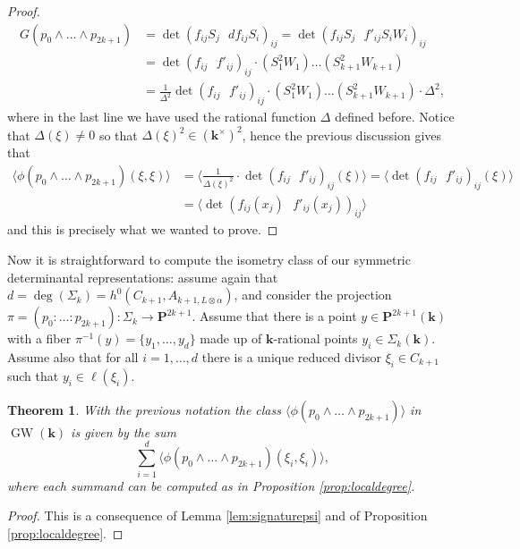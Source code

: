 \documentclass[12pt]{amsart}
\newcounter{thmcounter}
\numberwithin{equation}{section}
\numberwithin{thmcounter}{section}
\newtheorem{theorem}[thmcounter]{Theorem}
\theoremstyle{definition}
\theoremstyle{claim}
\newcommand{\kk}{\mathbf{k}}
\newcommand{\nP}{\mathbf{P}}
\DeclareMathOperator{\GW}{GW}
\begin{document}
\begin{proof}
	\begin{align*}
	 G(p_0\wedge\dots \wedge p_{2k+1}) &= \det \left( f_{ij}S_j \,\,\,\, df_{ij} S_i \right)_{ij} = \det \left( f_{ij}S_j \,\,\,\, f'_{ij} S_iW_i \right)_{ij} \\
	 &= \det\left( f_{ij} \,\,\,\, f'_{ij}  \right)_{ij}\cdot (S_1^2W_1)\dots (S^2_{k+1}W_{k+1}) \\
	 & = \frac{1}{\Delta^2}\det\left( f_{ij} \,\,\,\, f'_{ij}  \right)_{ij}\cdot (S_1^2W_1)\dots (S^2_{k+1}W_{k+1})\cdot \Delta^2,
	\end{align*}
	where in the last line we have used the rational function $\Delta$ defined before. Notice that $\Delta(\xi)\ne 0$ so that $\Delta(\xi)^2 \in (\kk^{\times})^2$, hence the previous discussion gives that
	\begin{align*}
	\langle \phi(p_0\wedge\dots\wedge p_{2k+1})(\xi,\xi) \rangle  &= \langle \frac{1}{\Delta(\xi)^2}\cdot \det \left( f_{ij} \,\,\,\, f'_{ij}  \right)_{ij}(\xi)\rangle = \langle \det \left( f_{ij} \,\,\,\, f'_{ij}  \right)_{ij}(\xi)\rangle\\
	&  = \langle \det \left( f_{ij}(x_j) \,\,\,\, f'_{ij}(x_j)  \right)_{ij}\rangle
	\end{align*}
	and this is precisely what we wanted to prove.
\end{proof}

Now it is straightforward to compute the isometry class of our symmetric determinantal representations: assume again that $d=\deg(\Sigma_k)=h^0(C_{k+1},A_{k+1,L\otimes\alpha})$, and consider the projection $\pi=(p_0:\dots:p_{2k+1})\colon \Sigma_{k} \longrightarrow \nP^{2k+1}$. Assume that there is a point  $y\in \nP^{2k+1}(\kk)$ with a fiber $\pi^{-1}(y)=\{y_1,\dots,y_d\}$ made up of $\kk$-rational points $y_i \in \Sigma_{k}(\kk)$. Assume also that  for all $i=1,\dots,d$ there is a unique reduced divisor $\xi_i\in C_{k+1}$ such that $y_i \in \ell(\xi_i)$.

\begin{theorem}\label{thm:signatureformula}
	With the previous notation the class $\langle \phi(p_0\wedge\dots\wedge p_{2k+1})\rangle$ in $\GW(\kk)$ is given by the sum
	\[ \sum_{i=1}^{d} \langle \phi(p_0\wedge\dots\wedge p_{2k+1})(\xi_i,\xi_i)\rangle, \]
	where each summand can be computed as in Proposition \ref{prop:localdegree}.
\end{theorem}
\begin{proof}
	This is a consequence of Lemma \ref{lem:signaturepsi} and of Proposition \ref{prop:localdegree}.
\end{proof}
\end{document}
